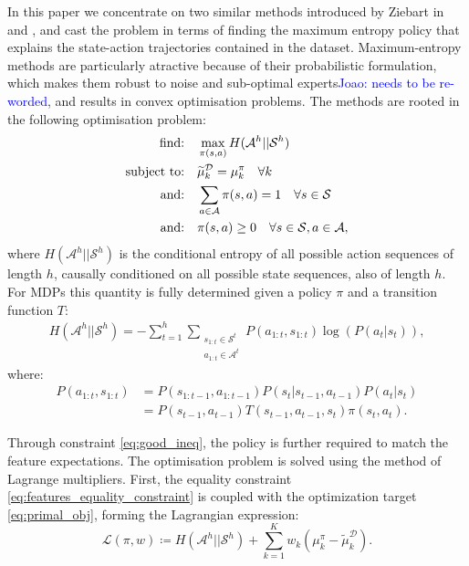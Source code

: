 \documentclass[letterpaper]{article}
\newcommand{\jm}[1]{\textcolor{blue}{Joao: #1}}
\newcommand{\jm}[1]{}
\begin{document}
In this paper we concentrate on two similar methods introduced by Ziebart in \cite{ziebart2008maximum} and \cite{ziebart2010modelingthesis}, and cast the problem in terms of finding the maximum entropy policy that explains the state-action trajectories contained in the dataset. Maximum-entropy methods are particularly atractive because of their probabilistic formulation, which makes them robust to noise and sub-optimal experts\jm{needs to be re-worded}, and results in convex optimisation problems. The methods are rooted in the following optimisation problem:
\begin{align}
	\hbox{find:} &\quad\max\limits_{\pi(s,a)} H(\mathcal{A}^h||\mathcal{S}^h)\label{eq:primal_obj}\\
\hbox{subject to:}&\quad\widetilde{\mu}^{\mathcal{D}}_k   = \mu^{\pi}_k\quad\forall k \label{eq:features_equality_constraint}\\
\hbox{and:} &\quad\sum_{a\in\mathcal{A}}\pi(s,a)  = 1\quad\forall s\in\mathcal{S}\\
\hbox{and:} &\quad\pi(s,a) \geq 0\quad\forall s\in\mathcal{S},a\in\mathcal{A},  
\end{align}
where $H(\mathcal{A}^h||\mathcal{S}^h)$ is the conditional entropy of all possible action sequences of length $h$, causally conditioned on all possible state sequences, also of length $h$. For MDPs this quantity is fully determined given a policy $\pi$ and a transition function $T$:
\begin{align}
H(\mathcal{A}^h||\mathcal{S}^h) = -\sum_{t=1}^h \sum_{\substack{s_{1:t}\in\mathcal{S}^t\\a_{1:t}\in\mathcal{A}^t}} P(a_{1:t},s_{1:t})\log(P(a_t|s_t)),
\label{eg:entdef}
\end{align}
where:
\begin{align*}
  P(a_{1:t},s_{1:t})&= P(s_{1:t-1},a_{1:t-1})P(s_t|s_{t-1},a_{t-1})P(a_t|s_t)\\
  &=P(s_{t-1},a_{t-1})T(s_{t-1},a_{t-1},s_t)\pi(s_t,a_t).
\end{align*}

Through constraint \eqref{eq:good_ineq}, the policy is further required to match the feature expectations. The optimisation problem is solved using the method of Lagrange multipliers. First, the equality constraint \eqref{eq:features_equality_constraint} is coupled with the optimization target \eqref{eq:primal_obj}, forming the Lagrangian expression:
\begin{equation}
\label{eq:partial_lagrangian}
\mathcal{L}(\pi,w)\coloneqq H(\mathcal{A}^h||\mathcal{S}^h) + \sum_{k=1}^Kw_k(\mu^{\pi}_k-\widetilde{\mu}^{\mathcal{D}}_k).
\end{equation}
\end{document}
